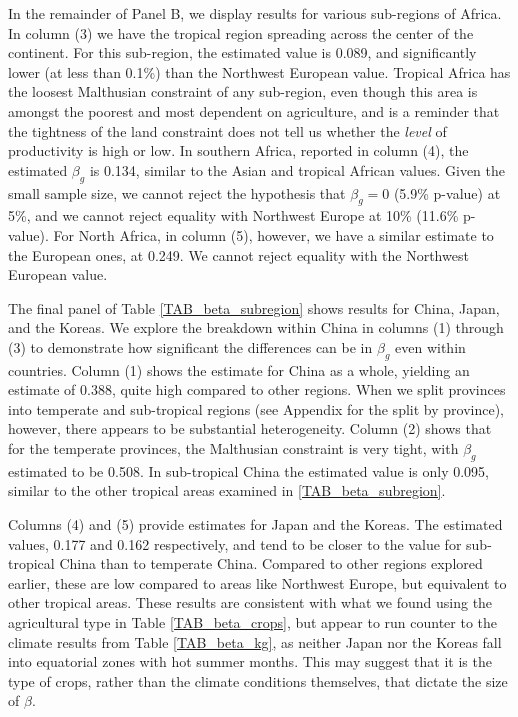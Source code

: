 \documentclass[11pt]{article}
\begin{document}
In the remainder of Panel B, we display results for various sub-regions of Africa. In column (3) we have the tropical region spreading across the center of the continent. For this sub-region, the estimated value is 0.089, and significantly lower (at less than 0.1\%) than the Northwest European value. Tropical Africa has the loosest Malthusian constraint of any sub-region, even though this area is amongst the poorest and most dependent on agriculture, and is a reminder that the tightness of the land constraint does not tell us whether the \textit{level} of productivity is high or low. In southern Africa, reported in column (4), the estimated $\beta_g$ is 0.134, similar to the Asian and tropical African values. Given the small sample size, we cannot reject the hypothesis that $\beta_g=0$ (5.9\% p-value) at 5\%, and we cannot reject equality with Northwest Europe at 10\% (11.6\% p-value). For North Africa, in column (5), however, we have a similar estimate to the European ones, at 0.249. We cannot reject equality with the Northwest European value.

The final panel of Table \ref{TAB_beta_subregion} shows results for China, Japan, and the Koreas. We explore the breakdown within China in columns (1) through (3) to demonstrate how significant the differences can be in $\beta_g$ even within countries. Column (1) shows the estimate for China as a whole, yielding an estimate of 0.388, quite high compared to other regions. When we split provinces into temperate and sub-tropical regions (see Appendix for the split by province), however, there appears to be substantial heterogeneity. Column (2) shows that for the temperate provinces, the Malthusian constraint is very tight, with $\beta_g$ estimated to be 0.508. In sub-tropical China the estimated value is only 0.095, similar to the other tropical areas examined in \ref{TAB_beta_subregion}.

Columns (4) and (5) provide estimates for Japan and the Koreas. The estimated values, 0.177 and 0.162 respectively, and tend to be closer to the value for sub-tropical China than to temperate China. Compared to other regions explored earlier, these are low compared to areas like Northwest Europe, but equivalent to other tropical areas. These results are consistent with what we found using the agricultural type in Table \ref{TAB_beta_crops}, but appear to run counter to the climate results from Table \ref{TAB_beta_kg}, as neither Japan nor the Koreas fall into equatorial zones with hot summer months. This may suggest that it is the type of crops, rather than the climate conditions themselves, that dictate the size of $\beta$.
\end{document}
